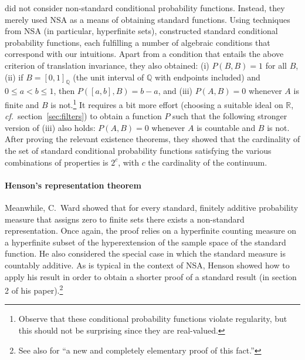 \citeauthor{ParikhParnes:1974} did not consider non-standard conditional probability functions. Instead, they merely used NSA as a means of obtaining standard functions.
Using techniques from NSA (in particular, hyperfinite sets), \citeauthor{ParikhParnes:1974} constructed standard conditional probability functions, each fulfilling a number of algebraic conditions that correspond with our intuitions. Apart from a condition that entails the above criterion of translation invariance, they also obtained: (i) $P(B,B)=1$ for all $B$, (ii) if $B=[0,1]_\mathbb{Q}$ (the unit interval of $\mathbb{Q}$ with endpoints included) and $0 \leq a < b \leq 1$, then $P([a,b],B)=b-a$, and (iii) $P(A,B)=0$ whenever $A$ is finite and $B$ is not.\footnote{Observe that these conditional probability functions violate regularity, but this should not be surprising since they are real-valued.} It requires a bit more effort (choosing a suitable ideal on $\mathbb{R}$, \textit{cf.}\ section~\ref{sec:filters}) to obtain a function $P$ such that the following stronger version of (iii) also holds: $P(A,B)=0$ whenever $A$ is countable and $B$ is not.
After proving the relevant existence theorems, they showed that the cardinality of the set of standard conditional probability functions satisfying the various combinations of properties is $2^c$, with $c$ the cardinality of the continuum.

\paragraph{Henson's representation theorem}
Meanwhile, C.~Ward \citet{Henson:1972} showed that for every standard, finitely additive probability measure that assigns zero to finite sets there exists a non-standard representation. Once again, the proof relies on a hyperfinite counting measure on a hyperfinite subset of the hyperextension of the sample space of the standard function. He also considered the special case in which the standard measure is countably additive. As is typical in the context of NSA, Henson showed how to apply his result in order to obtain a shorter proof of a standard result (in section 2 of his paper).\footnote{See also \citet{HofweberSchindler:2016} for ``a new and completely elementary proof of this fact.''}

